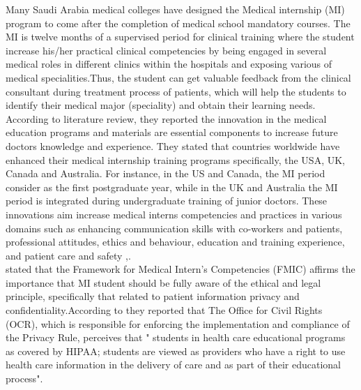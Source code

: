 Many Saudi Arabia medical colleges have designed the Medical internship (MI) program to come after the completion of medical school mandatory courses. The MI is twelve months of a supervised period for clinical training where the student increase his/her practical clinical competencies by being engaged in several medical roles in different clinics within the hospitals and exposing various of medical specialities.Thus, the student can get valuable feedback from the clinical consultant during treatment process of patients, which will help the students to identify their medical major (speciality) and obtain their learning needs. According to \citet{Al-Moamary2010} literature review, they reported the innovation in the medical education programs and materials are essential components to increase future doctors knowledge and experience. They stated that countries worldwide have enhanced their medical internship training programs specifically, the USA, UK, Canada and Australia. For instance, in the US and Canada, the MI period consider as the first postgraduate year, while in the UK and Australia the MI period is integrated during undergraduate training of junior doctors. These innovations aim increase medical interns competencies and practices in various domains such as enhancing communication skills with co-workers and patients, professional attitudes, ethics and behaviour, education and training experience, and patient care and safety \cite{Al-Moamary2010},\cite{FaculityofMedicine2009}.
\\
\citet{Al-moamary2012} stated that the Framework for Medical Intern's Competencies (FMIC) affirms the importance that MI student should be fully aware of the ethical and legal principle, specifically that related to patient information privacy and confidentiality.According to \citet{Wimberley2005} they reported that The Office for Civil Rights (OCR), which is responsible for enforcing the implementation and compliance of the Privacy Rule, perceives that " students in health care educational programs as covered by HIPAA; students are viewed as providers who have a right to use health care information in the delivery of care and as part of their educational process"\cite{Wimberley2005}. \\
